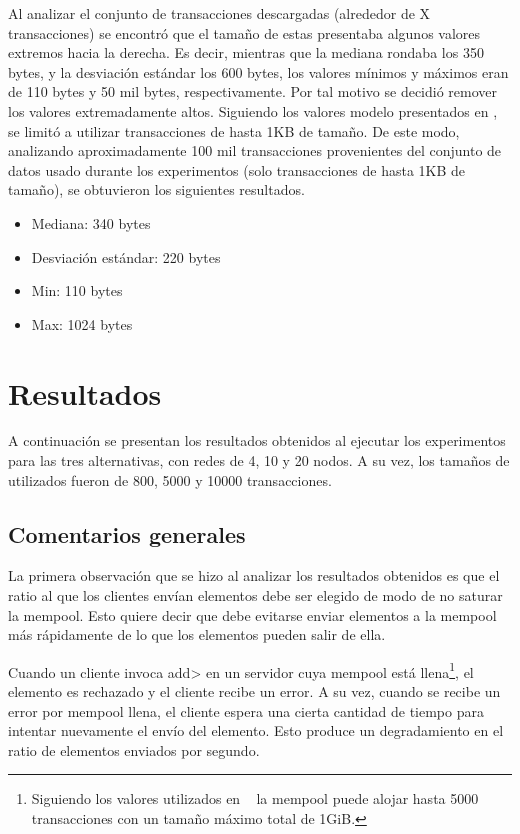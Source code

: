 %
Al analizar el conjunto de transacciones descargadas (alrededor de X transacciones) se encontró que el tamaño de
estas presentaba algunos valores extremos hacia la derecha.
Es decir, mientras que la mediana rondaba los 350 bytes, y la desviación estándar los 600 bytes, los valores mínimos y máximos eran de
110 bytes y  50 mil bytes, respectivamente.
Por tal motivo se decidió remover los valores extremadamente altos.
Siguiendo los valores modelo presentados en \cite{tendermint.design}, se limitó a utilizar transacciones de hasta 1KB de tamaño.
De este modo, analizando aproximadamente 100 mil transacciones provenientes del conjunto de datos usado
durante los experimentos (solo transacciones de hasta 1KB de tamaño), se obtuvieron los siguientes resultados.
\begin{itemize}
	\item Mediana: 340 bytes
	\item Desviación estándar: 220 bytes
	\item Min: 110 bytes
	\item Max: 1024 bytes
\end{itemize}

\section{Resultados}

A continuación se presentan los resultados obtenidos al ejecutar los experimentos para las tres alternativas,
con redes de 4, 10 y 20 nodos. A su vez, los tamaños de \collector utilizados fueron de
800, 5000 y 10000 transacciones.

\subsection{Comentarios generales}

La primera observación que se hizo al analizar los resultados obtenidos es que el ratio al que los clientes envían elementos
debe ser elegido de modo de no saturar la mempool.
Esto quiere decir que debe evitarse enviar elementos a la mempool más rápidamente de lo que los elementos pueden salir de ella.

Cuando un cliente invoca \<add> en un servidor cuya mempool está llena\footnote{Siguiendo los valores utilizados en
~\cite{tendermint.design} la mempool puede alojar hasta 5000 transacciones con un tamaño máximo total de 1GiB.},
el elemento es rechazado y el cliente recibe un error.
A su vez, cuando se recibe un error por mempool llena, el cliente espera una cierta cantidad de tiempo para intentar
nuevamente el envío del elemento.
Esto produce un degradamiento en el ratio de elementos enviados por segundo.


